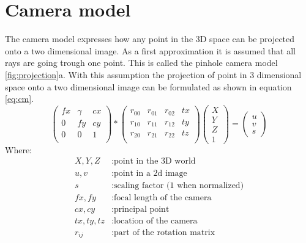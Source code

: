 \documentclass[11pt,a4paper,titlepage,oneside]{report}
\begin{document}
\section{Camera model}
The camera model expresses how any point in the 3D space can be projected onto a two dimensional image. As a first approximation it is assumed that all rays are going trough one point. This is called the pinhole camera model \ref{fig:projection}a. With this assumption the projection of point in 3 dimensional space onto a two dimensional image can be formulated as shown in equation \ref{eq:cm}. 
\begin{equation}\label{eq:cm}
  \begin{pmatrix}fx & \gamma & cx \\
      0 & fy & cy \\
      0 & 0 & 1 \\
    \end{pmatrix}*
    \begin{pmatrix}
      r_{00} & r_{01} & r_{02} & tx \\
      r_{10} & r_{11} & r_{12} & ty \\
      r_{20} & r_{21} & r_{22} & tz \\
    \end{pmatrix}
    \begin{pmatrix}
      X \\
      Y \\
      Z \\
      1
    \end{pmatrix}=
    \begin{pmatrix}
      u \\
      v \\
      s
  \end{pmatrix}
\end{equation}
Where:
\begin{align*}
  X,Y,Z		&: \text{point in the 3D world}\\
  u,v	    	&: \text{point in a 2d image}\\
  s		&: \text{scaling factor (1 when normalized)}\\
	fx,fy   	&: \text{focal length of the camera}\\
  cx,cy   	&: \text{principal point}\\
  tx,ty,tz	&: \text{location of the camera}\\
  r_{ij}	&: \text{part of the rotation matrix}
\end{align*}
\end{document}
